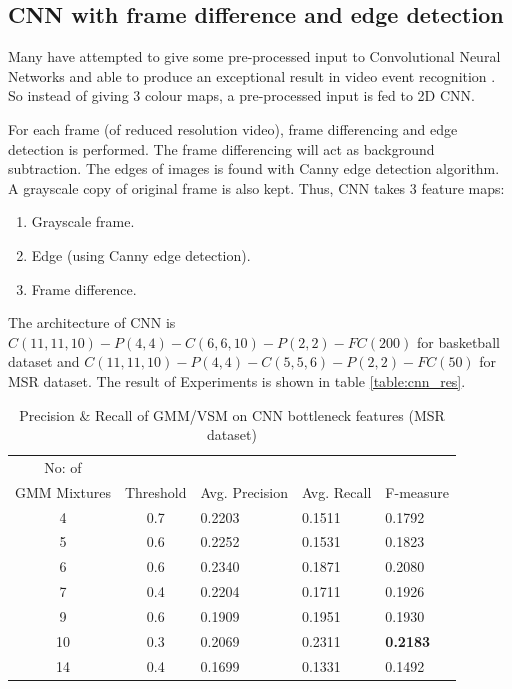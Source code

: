 \subsection{CNN with frame difference and edge detection}

Many have attempted to give some pre-processed input to Convolutional Neural Networks and able to produce an exceptional result in video event recognition \citep{ji20133d}. So instead of giving 3 colour maps, a pre-processed input is fed to 2D CNN.

For each frame (of reduced resolution video), frame differencing and edge detection is performed. The frame differencing will act as background subtraction. The edges of images is found with Canny edge detection algorithm. A grayscale copy of original frame is also kept. Thus, CNN takes 3 feature maps:
\begin{enumerate}
\item Grayscale frame.
\item Edge (using Canny edge detection).
\item Frame difference.
\end{enumerate}

The architecture of CNN is $C(11, 11, 10)-P(4, 4)-C(6, 6, 10)-P(2, 2)-FC(200)$ for basketball dataset and $C(11, 11, 10)-P(4,4)-C(5, 5, 6)-P(2,2)-FC(50)$ for MSR dataset. The result of Experiments is shown in table \ref{table:cnn_res}.

\begin{table}[h]
\caption[Event spotting using GMM/VSM on CNN(Gray,Frame diff,Edge) bottleneck features (MSR Action Dataset) ]{ Precision \& Recall  of GMM/VSM on CNN bottleneck features (MSR dataset)}
\label{table:cnn_gmm_res_msr}
\centering
\begin{tabular}{|c|c|l|l|l|}
\hline
No: of &&&&\\
GMM Mixtures & Threshold & Avg. Precision & Avg. Recall & F-measure\\
\hline
\hline
 4 	&0.7 	&0.2203 	& 0.1511	&0.1792\\
 5 	&0.6 	&0.2252 	& 0.1531	&0.1823\\
 6 	&0.6 	&0.2340 	& 0.1871	&0.2080\\
 7 	&0.4 	&0.2204 	& 0.1711	&0.1926\\
 9 	&0.6 	&0.1909 	& 0.1951	&0.1930\\
10 	&0.3 	&0.2069 	& 0.2311	&\textbf{0.2183}\\
14 	&0.4 	&0.1699 	& 0.1331	&0.1492\\
\hline  
\end{tabular}
\end{table} 


